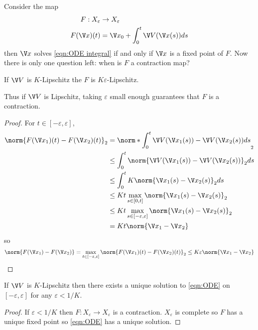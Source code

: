 \documentclass[a4paper]{article}
\theoremstyle{definition}
\begin{document}
Consider the map
\begin{align*}
  F: X_\varepsilon &\to X_\varepsilon \\
  F(\V x)(t) &= \V x_0 + \int_{0}^{t} \V V(\V x(s)) ds
\end{align*}
then \(\V x\) solves \eqref{eqn:ODE integral} if and only if \(\V x\) is a fixed point of \(F\). Now there is only one question left: when is \(F\) a contraction map?

\begin{proposition}
  If \(\V V\) is \(K\)-Lipschitz the \(F\) is \(K\varepsilon\)-Lipschitz.
\end{proposition}

Thus if \(\V V\) is Lipschitz, taking \(\varepsilon\) small enough guarantees that \(F\) is a contraction.

\begin{proof}
  For \(t \in [-\varepsilon, \varepsilon]\),
  \begin{align*}
    \norm{F(\V x_1)(t) - F(\V x_2)(t)}_2 &= \norm*{\int_0^t \V V(\V x_1(s)) - \V V(\V x_2(s)) ds}_2 \\
                                         &\leq \int_0^t \norm{\V V(\V x_1(s)) - \V V(\V x_2(s))}_2 ds \\
                                         &\leq \int_0^t K \norm{\V x_1(s) - \V x_2(s)}_2 ds \\
                                         &\leq Kt \max_{s \in [0, t]} \norm{\V x_1(s) - \V x_2(s)}_2 \\
                                         &\leq Kt \max_{s \in [-\varepsilon, \varepsilon]} \norm{\V x_1(s) - \V x_2(s)}_2 \\
                                         &= Kt \norm{\V x_1 - \V x_2}
  \end{align*}
  so
  \[
    \norm{F(\V x_1) - F(\V x_2)} = \max_{t \in [-\varepsilon, \varepsilon]} \norm{F(\V x_1)(t) - F(\V x_2)(t)}_2 \leq K \varepsilon \norm{\V x_1 - \V x_2}
  \]
\end{proof}

\begin{corollary}
  If \(\V V\) is \(K\)-Lipschitz then there exists a unique solution to \eqref{eqn:ODE} on \([-\varepsilon, \varepsilon]\) for any \(\varepsilon < 1/K\).
\end{corollary}

\begin{proof}
  If \(\varepsilon < 1/K\) then \(F: X_\varepsilon \to X_\varepsilon\) is a contraction. \(X_\varepsilon\) is complete so \(F\) has a unique fixed point so \eqref{eqn:ODE} has a unique solution.
\end{proof}
\end{document}

